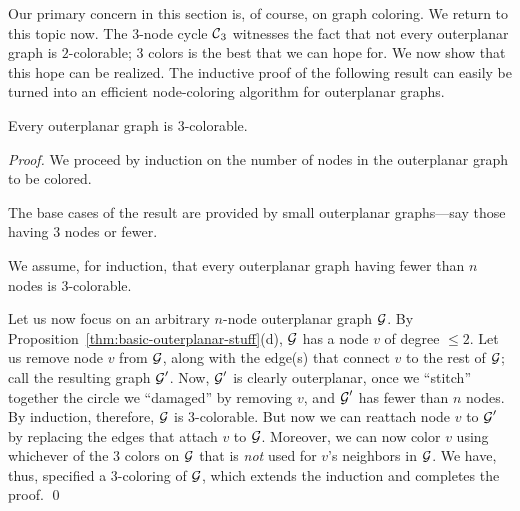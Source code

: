 \bigskip

Our primary concern in this section is, of course, on graph coloring.
We return to this topic now.  The $3$-node cycle $\mbox{$\cal C$}_3$ witnesses the
fact that not every outerplanar graph is $2$-colorable; $3$ colors is
the best that we can hope for.  We now show that this hope can be
realized.  The inductive proof of the following result can easily be
turned into an efficient node-coloring algorithm for outerplanar
graphs.

\begin{prop}
\label{thm:OP-3-colorability}
Every outerplanar graph is $3$-colorable.
\end{prop}

\begin{proof}
We proceed by induction on the number of nodes in the outerplanar
graph to be colored.

The base cases of the result are provided by small outerplanar
graphs---say those having $3$ nodes or fewer.

We assume, for induction, that every outerplanar graph having fewer
than $n$ nodes is $3$-colorable.

Let us now focus on an arbitrary $n$-node outerplanar graph $\mbox{$\cal G$}$.  By
Proposition~\ref{thm:basic-outerplanar-stuff}(d), $\mbox{$\cal G$}$ has a node $v$
of degree $\leq 2$.  Let us remove node $v$ from $\mbox{$\cal G$}$, along with the
edge(s) that connect $v$ to the rest of $\mbox{$\cal G$}$; call the resulting graph
$\mbox{$\cal G$}'$.  Now, $\mbox{$\cal G$}'$ is clearly outerplanar, once we ``stitch'' together
the circle we ``damaged'' by removing $v$, and $\mbox{$\cal G$}'$ has fewer than
$n$ nodes.  By induction, therefore, $\mbox{$\cal G$}$ is $3$-colorable.  But now
we can reattach node $v$ to $\mbox{$\cal G$}'$ by replacing the edges that attach
$v$ to $\mbox{$\cal G$}$.  Moreover, we can now color $v$ using whichever of the
$3$ colors on $\mbox{$\cal G$}$ that is {\em not} used for $v$'s neighbors in $\mbox{$\cal G$}$.
We have, thus, specified a $3$-coloring of $\mbox{$\cal G$}$, which extends the
induction and completes the proof.  \qed
\end{proof}



